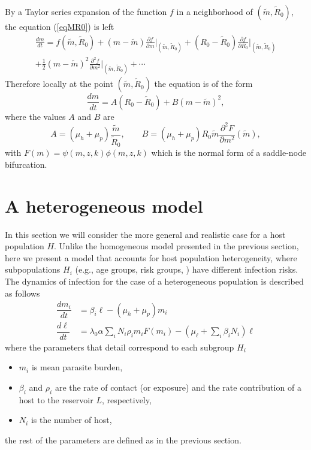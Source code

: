 \documentclass[eng]{MMSB-class-eng}
\begin{document}
By a Taylor series expansion of the function $f$ in a neighborhood of $(\tilde m,\tilde R_0)$, the equation (\ref{eqMR0}) is left
\begin{multline}
	\frac{dm}{dt}=f(\tilde m,\tilde R_0)+(m-\tilde m)\frac{\partial f }{\partial m}\big\vert_{(\tilde m,\tilde R_0)}%
	+(R_0-\tilde R_0){\frac{\partial f }{\partial R_0}\big\vert_{(\tilde m,\tilde R_0)}}%
	\\+{\frac {1}{2}}(m-\tilde m)^2{\frac{\partial^2 f }{\partial m^2}}\big\vert_{(\tilde m,\tilde R_0)}%
	+\cdots 
\end{multline}
Therefore locally at the point $(\tilde m,\tilde R_0)$ the equation is of the form
\begin{equation}
\dfrac{dm}{dt}=A(R_0-\tilde R_0)+B(m-\tilde m)^2,
\end{equation}
where the values $A$ and $B$ are
\begin{equation}
A=(\mu_h +\mu_p)\frac{\tilde m}{\tilde R_0}, \qquad  B=(\mu_h + \mu_p) R_0 \tilde m \frac{\partial^2 F}{\partial m^2}(\tilde m),
\end{equation}
with $F(m)= \psi(m,z,k)\phi(m,z, k)$
which is the normal form of a saddle-node bifurcation.

\section{A heterogeneous model}
In this section we will consider the more general and realistic case for a host population $H$. Unlike the homogeneous model presented in the previous section, here we present a model that accounts for host population heterogeneity, where subpopulations $H_i$ (e.g., age groups, risk groups, \citet{anderson1992infectious,anderson2014coverage,truscott2014modeling}) have different infection risks. The dynamics of infection for the case of a heterogeneous population is described as follows
\begin{equation}\label{model2}
\begin{split}
\dfrac{dm_i}{dt}&=\beta_i \ell - (\mu_h+\mu_p) m_i\\
\dfrac{d\ell}{dt}&= 
\lambda_0 \alpha
\sum_i  N_i \rho_i  m_i F(m_i)   - (\mu_{\ell}+\sum_i \beta_i N_i ) \ell 
\end{split}
\end{equation} 
where the parameters that detail correspond to each subgroup $H_i$
\begin{itemize}
	\item $m_i$ is mean parasite burden,
	\item $\beta_i$ and $\rho_i$  are the rate of contact (or exposure) and the rate contribution
	of a host to the reservoir $L$, respectively,
	\item $N_{i}$ is the number of host,
\end{itemize}
the rest of the parameters are defined as in the previous section.
\end{document}
